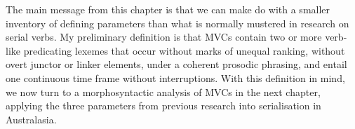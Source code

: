 The main message from this chapter is that we can make do with a smaller inventory of defining parameters than what is normally mustered in research on serial verbs. My preliminary definition is that MVCs contain two or more verb-like predicating lexemes that occur without marks of unequal ranking, without overt junctor or linker elements, under a coherent prosodic phrasing, and entail one continuous time frame without interruptions. With this definition in mind, we now turn to a morphosyntactic analysis of MVCs in the next chapter, applying the three parameters from previous research into serialisation in Australasia. 